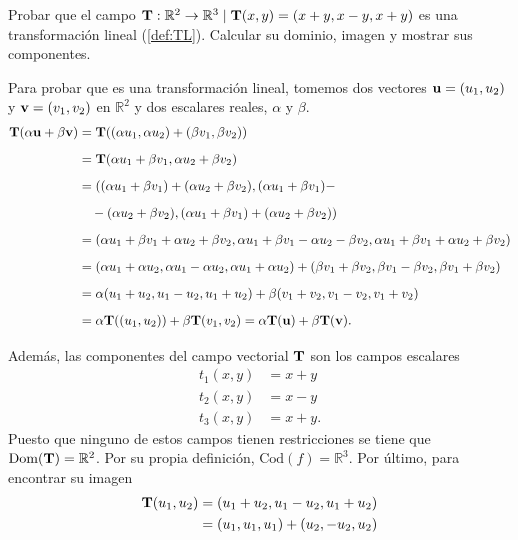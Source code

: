     \begin{example}
    Probar que el campo $\campoVec{T}:\mathbb{R}^2 \rightarrow \mathbb{R}^3 \; | \;   \campoVec{T}(x,y) = (x+y,x-y,x+y)$  es una transformaci\'on lineal (\autoref{def:TL}). Calcular su dominio, imagen y mostrar sus componentes.
    
    Para probar que es una transformación lineal, tomemos dos vectores  $\vect{u}=(u_1,u_2)$ y
    $\vect{v}=(v_1,v_2)$ en $\mathbb{R}^2$  y  dos escalares reales, $\alpha$ y $\beta$.
    \begin{align*}
      \campoVec{T}(\alpha\vect{u}+\beta\vect{v})&=\campoVec{T}((\alpha u_1,\alpha u_2)+(\beta v_1, \beta v_2))\\[.2cm]
      &=\campoVec{T}(\alpha u_1+\beta v_1,\alpha u_2 + \beta v_2)\\[.2cm]
      &= ((\alpha u_1+\beta v_1)+(\alpha u_2 + \beta v_2),(\alpha u_1+\beta v_1)-\\[.2cm]
      &\quad-(\alpha u_2 + \beta v_2),(\alpha u_1+\beta v_1)+(\alpha u_2 + \beta v_2))\\[.2cm]
      &= (\alpha u_1+\beta v_1+\alpha u_2+\beta v_2, \alpha u_1+\beta v_1 - \alpha u_2-\beta v_2, \alpha u_1+\beta v_1+\alpha u_2+\beta v_2)\\[.2cm]
      &= (\alpha u_1+\alpha u_2, \alpha u_1 - \alpha u_2,\alpha u_1+\alpha u_2) + (\beta v_1+\beta v_2, \beta v_1 - \beta v_2,\beta v_1+\beta v_2)\\[.2cm]
      &= \alpha  (u_1+u_2,u_1-u_2,u_1+u_2) + \beta  (v_1+v_2,v_1-v_2,v_1+v_2)\\[.2cm]
      &= \alpha  \campoVec{t}((u_1,u_2)) + \beta  \campoVec{T}(v_1,v_2)=\alpha  \campoVec{T}(\vect{u}) + \beta  \campoVec{T}(\vect{v}).\\[.2cm]
    \end{align*}
Adem\'as, las componentes del campo vectorial $\campoVec{T}$  son los campos escalares
    \begin{align*}
      t_1(x,y)&=x+y\\
      t_2(x,y)&=x-y\\
      t_3(x,y)&=x+y.
    \end{align*}
    Puesto que ninguno de estos campos tienen restricciones se tiene que $\text{Dom}(\campoVec{T})=\mathbb{R}^2$.  Por su propia definici\'on,  $\text{Cod}(f)=\mathbb{R}^3$. Por \'ultimo, para encontrar su imagen
    \begin{align*}
      \campoVec{T}(u_1,u_2)&=(u_1+u_2,u_1-u_2,u_1+u_2)\\
      &=(u_1,u_1,u_1)+(u_2,-u_2,u_2)\\

\end{align*}
\end{example}
